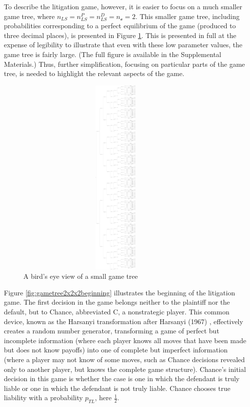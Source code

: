\documentclass{article}
\begin{document}
To describe the litigation game, however, it is easier to focus on a much smaller game tree, where $n_{LS}=n_{LS}^P=n_{LS}^D=n_{\mathcal{o}}=2$. This smaller game tree, including probabilities corresponding to a perfect equilibrium of the game (produced to three decimal places), is presented in Figure \ref{fig:gametree2x2x2}. This is presented in full at the expense of legibility to illustrate that even with these low parameter values, the game tree is fairly large. (The full figure is available in the Supplemental Materials.) Thus, further simplification, focusing on particular parts of the game tree, is needed to highlight the relevant aspects of the game.
\begin{figure}[h!]
\centering
\includegraphics[width=10cm, height=10cm, trim={0in 0in 0in 0in}, clip]{../Figures/game tree 2x2x2.pdf}
\caption{A bird's eye view of a small game tree}
\label{fig:gametree2x2x2}
\end{figure}

Figure \ref{fig:gametree2x2x2beginning} illustrates the beginning of the litigation game. The first decision in the game belongs neither to the plaintiff nor the default, but to Chance, abbreviated C, a nonstrategic player. This common device, known as the Harsanyi transformation after Harsanyi (1967) \cite{harsanyi}, effectively creates a random number generator, transforming a game of perfect but incomplete information (where each player knows all moves that have been made but does not know payoffs) into one of complete but imperfect information (where a player may not know of some moves, such as Chance decisions revealed only to another player, but knows the complete game structure). Chance's initial decision in this game is whether the case is one in which the defendant is truly liable or one in which the defendant is not truly liable. Chance chooses true liability with a probability $p_{TL}$, here $\frac{1}{2}$. 
\end{document}
